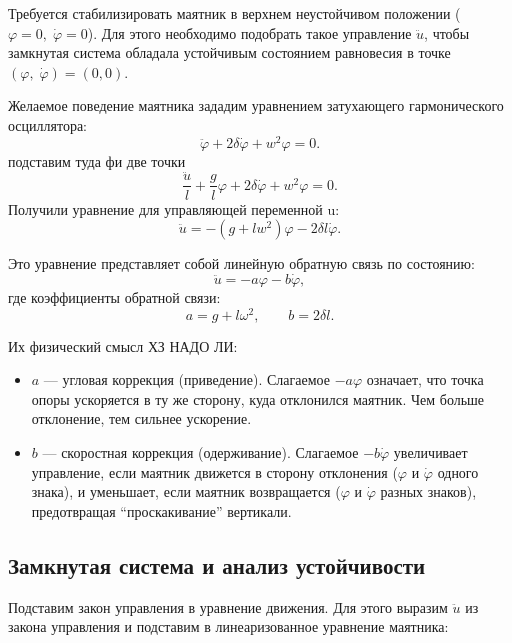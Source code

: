 \documentclass[a4paper, 12pt]{article}
\begin{document}
Требуется стабилизировать маятник в верхнем неустойчивом положении 
(\(\varphi = 0,\; \dot{\varphi} = 0\)). Для этого необходимо подобрать 
такое управление \(\ddot{u}\), чтобы замкнутая система обладала 
устойчивым состоянием равновесия в точке \((\varphi,\; \dot{\varphi}) = (0, 0)\).

Желаемое поведение маятника зададим уравнением затухающего гармонического осциллятора:
\[
\ddot{\varphi} + 2\delta \dot{\varphi} + w^2 \varphi = 0.
\]
подставим туда фи две точки
\[
\frac{\ddot{u}}{l} + \frac{g}{l} \varphi + 2\delta \dot{\varphi} + w^2 \varphi = 0.
\]
Получили уравнение для управляющей переменной u:
\[
\ddot{u} = -(g + l w^2) \varphi - 2\delta l \dot{\varphi}.
\]

Это уравнение представляет собой линейную обратную связь по состоянию:
\begin{equation}
\ddot{u} = -a\varphi - b\dot{\varphi}, \label{eq:state_feedback}
\end{equation}
где коэффициенты обратной связи:
\[
a = g + l\omega^2, \qquad b = 2\delta l.
\]

Их физический смысл ХЗ НАДО ЛИ:

\begin{itemize}
    \item \(a\) — угловая коррекция (приведение). Слагаемое \(-a\varphi\) означает, 
    что точка опоры ускоряется в ту же сторону, куда отклонился маятник. 
    Чем больше отклонение, тем сильнее ускорение.
    
    \item \(b\) — скоростная коррекция (одерживание). Слагаемое \(-b\dot{\varphi}\) 
    увеличивает управление, если маятник движется в сторону отклонения 
    (\(\varphi\) и \(\dot{\varphi}\) одного знака), и уменьшает, если маятник 
    возвращается (\(\varphi\) и \(\dot{\varphi}\) разных знаков), предотвращая 
    ``проскакивание'' вертикали.
\end{itemize}











\subsection{Замкнутая система и анализ устойчивости}

Подставим закон управления в уравнение движения. Для этого выразим $\ddot{u}$ из закона управления и подставим в линеаризованное уравнение маятника:
\end{document}
